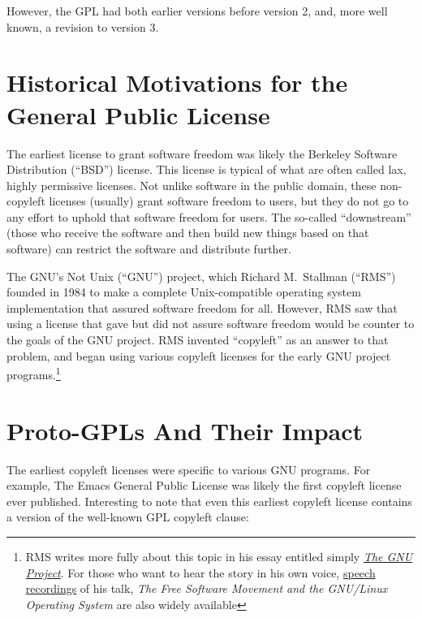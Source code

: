 However, the GPL had both earlier versions before version 2, and, more well
known, a revision to version 3. 

\section{Historical Motivations for the General Public License}

The earliest license to grant software freedom was likely the Berkeley
Software Distribution (``BSD'') license.  This license is typical of what are
often called lax, highly permissive licenses.  Not unlike software in the
public domain, these non-copyleft licenses (usually) grant software freedom
to users, but they do not go to any effort to uphold that software freedom
for users.  The so-called ``downstream'' (those who receive the software and
then build new things based on that software) can restrict the software and
distribute further.

The GNU's Not Unix (``GNU'') project, which Richard M.~Stallman (``RMS'')
founded in 1984 to make a complete Unix-compatible operating system
implementation that assured software freedom for all.  However, RMS saw that
using a license that gave but did not assure software freedom would be
counter to the goals of the GNU project.  RMS invented ``copyleft'' as an
answer to that problem, and began using various copyleft licenses for the
early GNU project programs.\footnote{RMS writes more fully about this topic in
  his essay entitled simply
  \href{http://www.gnu.org/gnu/thegnuproject.html}{\textit{The GNU Project}}.
    For those who want to hear the story in his own voice,
    \href{http://audio-video.gnu.org/audio/}{speech recordings} of his talk,
    \textit{The Free Software Movement and the GNU/Linux Operating System}
    are also widely available}

\section{Proto-GPLs And Their Impact}

The earliest copyleft licenses were specific to various GNU programs.  For
example,  The Emacs
General Public License was likely the first copyleft license ever
published.  Interesting to note that even this earliest copyleft license
contains a version of the well-known GPL copyleft clause:

